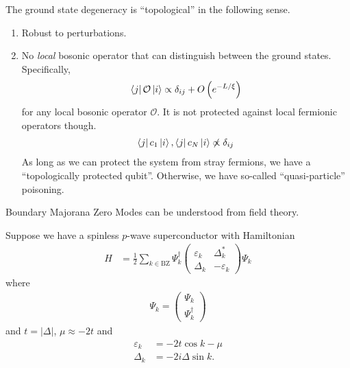 The ground state degeneracy is ``topological''
in the following sense.
\begin{enumerate}
    \item Robust to perturbations.
    \item No \emph{local} bosonic operator that can distinguish between the
        ground states.
        Specifically,
        \begin{align}
            \bra{j}\mathcal{O}\ket{i} \propto \delta_{ij}
            + O\left( e^{-L/\xi} \right)
        \end{align}
        for any local bosonic operator $\mathcal{O}$.
        It is not protected against local fermionic operators though.
        \begin{align}
            \bra{j}c_1\ket{i}, \bra{j} c_N\ket{i}
            \not\propto \delta_{ij}
        \end{align}
        As long as we can protect the system from stray fermions,
        we have a
        ``topologically protected qubit''.
        Otherwise,
        we have so-called ``quasi-particle'' poisoning.
\end{enumerate}
Boundary Majorana Zero Modes can be understood from field theory.

Suppose we have a spinless $p$-wave superconductor with Hamiltonian
\begin{align}
    H &= \frac{1}{2}\sum_{k\in\mathrm{BZ}}
    \Psi_k^\dagger
    \begin{pmatrix}
        \varepsilon_k & \Delta_k^*\\
        \Delta_k & -\varepsilon_k
    \end{pmatrix}
    \Psi_k
\end{align}
where
\begin{align}
    \Psi_k =
    \begin{pmatrix}
        \Psi_k\\
        \Psi_k^\dagger
    \end{pmatrix}
\end{align}
and $t=|\Delta|$, $\mu\approx -2t$ and
\begin{align}
    \varepsilon_k &= -2t\cos k - \mu\\
    \Delta_k &= -2i\Delta\sin k.
\end{align}

